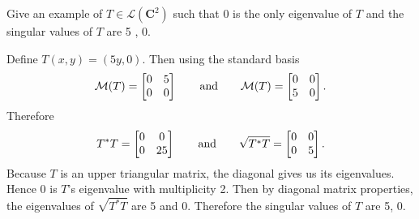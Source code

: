 Give an example of $T \in \mathcal{L}(\mathbf{C}^2)$ such that 0 is the only eigenvalue of $T$ and the singular values of $T$ are 5 , 0.

\soln Define $T(x,y) = (5y, 0)$. Then using the standard basis
$$\mathcal M(T) = \begin{bmatrix}
    0 & 5 \\ 0 & 0
\end{bmatrix} \qquad \text{and} \qquad \mathcal M(T) = \begin{bmatrix}
    0 & 0 \\ 5 & 0
\end{bmatrix}.$$
Therefore
$$T^*T = \begin{bmatrix}
    0 & 0 \\ 0 & 25
\end{bmatrix} \qquad \text{and} \qquad \sqrt{T^*T} = \begin{bmatrix}
    0 & 0 \\ 0 & 5
\end{bmatrix}.$$
Because $T$ is an upper triangular matrix, the diagonal gives us its eigenvalues. Hence 0 is $T$'s eigenvalue with multiplicity 2. Then by diagonal matrix properties, the eigenvalues of $\sqrt{T^*T}$ are 5 and 0. Therefore the singular values of $T$ are 5, 0.